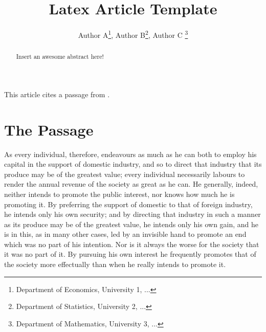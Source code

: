 \documentclass[12 pt,a4paper]{article}
\title{Latex Article Template}
\author{Author A\thanks{Department of Economics, University 1, ...}, Author B\thanks{Department of Statistics, University 2, ...}, Author C \thanks{Department of Mathematics, University 3, ...}}
\begin{document}
\maketitle
\thispagestyle{empty}

\begin{abstract}
Insert an awesome abstract here!    
\end{abstract}

\clearpage

This article cites a passage from \citet{smith1827inquiry}.
 
\section{The Passage}

As every individual, therefore, endeavours as much as he can both to employ his capital in the support of domestic industry, and so to direct that industry that its produce may be of the greatest value; every individual necessarily labours to render the annual revenue of the society as great as he can. He generally, indeed, neither intends to promote the public interest, nor knows how much he is promoting it. By preferring the support of domestic to that of foreign industry, he intends only his own security; and by directing that industry in such a manner as its produce may be of the greatest value, he intends only his own gain, and he is in this, as in many other cases, led by an invisible hand to promote an end which was no part of his intention. Nor is it always the worse for the society that it was no part of it. By pursuing his own interest he frequently promotes that of the society more effectually than when he really intends to promote it.



\end{document}
